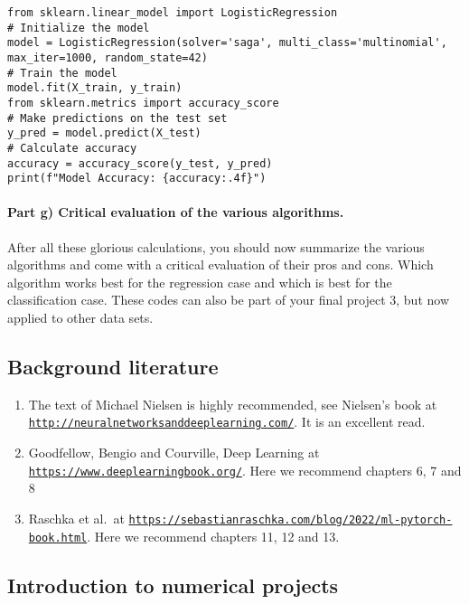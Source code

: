 \documentclass[%
oneside,                 %
final,                   %
10pt]{article}
\begin{document}
\begin{verbatim}
from sklearn.linear_model import LogisticRegression
# Initialize the model
model = LogisticRegression(solver='saga', multi_class='multinomial', max_iter=1000, random_state=42)
# Train the model
model.fit(X_train, y_train)
from sklearn.metrics import accuracy_score
# Make predictions on the test set
y_pred = model.predict(X_test)
# Calculate accuracy
accuracy = accuracy_score(y_test, y_pred)
print(f"Model Accuracy: {accuracy:.4f}")

\end{verbatim}


\paragraph{Part g) Critical evaluation of the various algorithms.}
After all these glorious calculations, you should now summarize the
various algorithms and come with a critical evaluation of their pros
and cons. Which algorithm works best for the regression case and which
is best for the classification case. These codes can also be part of
your final project 3, but now applied to other data sets.

\subsection*{Background literature}

\begin{enumerate}
\item The text of Michael Nielsen is highly recommended, see Nielsen's book at \href{{http://neuralnetworksanddeeplearning.com/}}{\nolinkurl{http://neuralnetworksanddeeplearning.com/}}. It is an excellent read.

\item Goodfellow, Bengio and Courville, Deep Learning at \href{{https://www.deeplearningbook.org/}}{\nolinkurl{https://www.deeplearningbook.org/}}. Here we recommend chapters 6, 7 and 8

\item Raschka et al.~at \href{{https://sebastianraschka.com/blog/2022/ml-pytorch-book.html}}{\nolinkurl{https://sebastianraschka.com/blog/2022/ml-pytorch-book.html}}. Here we recommend chapters 11, 12 and 13.
\end{enumerate}

\noindent
\subsection*{Introduction to numerical projects}
\end{document}
